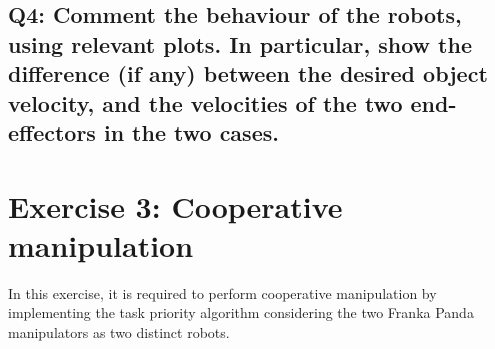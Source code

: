 \documentclass{article}
\begin{document}
\subsection{Q4: Comment the behaviour of the robots, using relevant plots. In particular, show the difference (if any) between the desired object velocity, and the velocities of the two end-effectors in the two cases.}

\clearpage

\section{Exercise 3: Cooperative manipulation}
In this exercise, it is required to perform cooperative manipulation by implementing the task priority algorithm considering the two Franka Panda manipulators as two distinct robots. 
\end{document}
